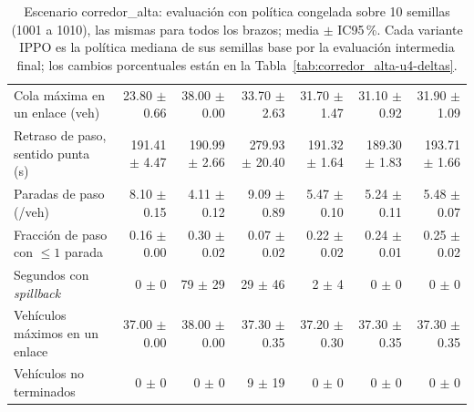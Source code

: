 \begin{table}[H]
\begin{tabular}{p{2.8cm}rrrrrr}
Cola máxima en un enlace (veh) & 23.80 $\pm$ 0.66 & 38.00 $\pm$ 0.00 & 33.70 $\pm$ 2.63 & 31.70 $\pm$ 1.47 & 31.10 $\pm$ 0.92 & 31.90 $\pm$ 1.09 \\
Retraso de paso, sentido punta (s) & 191.41 $\pm$ 4.47 & 190.99 $\pm$ 2.66 & 279.93 $\pm$ 20.40 & 191.32 $\pm$ 1.64 & 189.30 $\pm$ 1.83 & 193.71 $\pm$ 1.66 \\
Paradas de paso (/veh) & 8.10 $\pm$ 0.15 & 4.11 $\pm$ 0.12 & 9.09 $\pm$ 0.89 & 5.47 $\pm$ 0.10 & 5.24 $\pm$ 0.11 & 5.48 $\pm$ 0.07 \\
Fracción de paso con $\le 1$ parada & 0.16 $\pm$ 0.00 & 0.30 $\pm$ 0.02 & 0.07 $\pm$ 0.02 & 0.22 $\pm$ 0.02 & 0.24 $\pm$ 0.01 & 0.25 $\pm$ 0.02 \\
Segundos con \textit{spillback} & 0 $\pm$ 0 & 79 $\pm$ 29 & 29 $\pm$ 46 & 2 $\pm$ 4 & 0 $\pm$ 0 & 0 $\pm$ 0 \\
Vehículos máximos en un enlace & 37.00 $\pm$ 0.00 & 38.00 $\pm$ 0.00 & 37.30 $\pm$ 0.35 & 37.20 $\pm$ 0.30 & 37.30 $\pm$ 0.35 & 37.30 $\pm$ 0.35 \\
Vehículos no terminados & 0 $\pm$ 0 & 0 $\pm$ 0 & 9 $\pm$ 19 & 0 $\pm$ 0 & 0 $\pm$ 0 & 0 $\pm$ 0 \\
\bottomrule
\end{tabular}
\caption[Escenario corredor\_alta: evaluación de las variantes IPPO]{Escenario corredor\_alta: evaluación con política congelada sobre 10 semillas (1001 a 1010), las mismas para todos los brazos; media $\pm$ IC95\,\%. Cada variante IPPO es la política mediana de sus semillas base por la evaluación intermedia final; los cambios porcentuales están en la Tabla~\ref{tab:corredor_alta-u4-deltas}.}
\label{tab:corredor_alta-u4}
\end{table}
